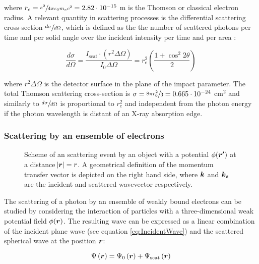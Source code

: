 where $r_e= \sfrac{e^2}{4\pi\epsilon_0 m_e c^2}=2.82\cdot10^{-15}$ m is the Thomson or classical electron radius. A relevant quantity in scattering processes is the differential scattering cross-section $\sfrac{d\sigma}{d\Omega}$, which is defined as the the number of scattered photons per time and per solid angle over the incident intensity per time and per area \citep{als-nielsen_elements_2011}:

\begin{equation}
        \label{eq:thomson_cross_section}
        \frac{d\sigma}{d\Omega}= \frac{I_{\text{scat}} \cdot \left(r^2 \Delta \Omega \right)}{I_0\Delta \Omega}=r_e^2\left( \frac{1+\cos^2{2\theta}}{2} \right)
\end{equation}

where $r^2 \Delta \Omega$ is the detector surface in the plane of the impact parameter. The total Thomson scattering cross-section is $\sigma = \sfrac{8\pi r_0^2}{3} = 0.665\cdot10^{-24}$ cm$^2$ and similarly to $\sfrac{d\sigma}{d\Omega}$ is proportional to $r_e^2$ and independent from the photon energy if the photon wavelength is distant of an X-ray absorption edge.

\subsubsection{Scattering by an ensemble of electrons}

\begin{figure}%
	\centering
	        \def\svgwidth{0.75\linewidth}
		
		\caption[Schematics of a scattering process and graphical definition of $\vect{q}$]{Scheme of an scattering event by an object with a potential $\phi(\bm{r'})$ at a distance $\abs{\bm{r}}=r$. A geometrical definition of the momentum transfer vector is depicted on the right hand side, where $\bm{k}$ and $\bm{k_s}$ are the incident and scattered wavevector respectively.}
		\label{fig:FraunhoferScheme}
\end{figure}

The scattering of a photon by an ensemble of weakly bound electrons can be studied by considering the interaction of particles with a three-dimensional weak potential field $\phi(\bm{r})$. The resulting wave can be expressed as a linear combination of the incident plane wave (see equation \ref{eq:IncidentWave}) and the scattered spherical wave at the position $\bm{r}$:

\begin{equation}
       \Psi\left( \bm{r} \right)= \Psi_0\left( \bm{r} \right) +  \Psi_{\text{scat}}\left( \bm{r} \right)
\end{equation}

